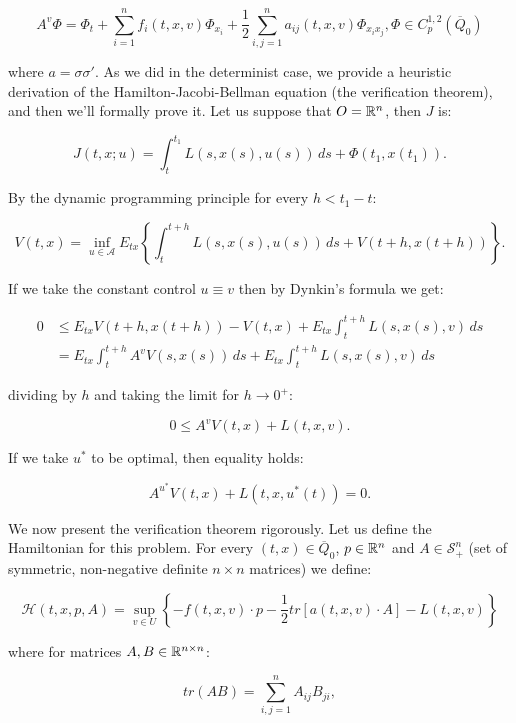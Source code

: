 \begin{equation}\label{2-1-defAwithv}
    A^{v}\Phi = \Phi_t + \sum_{i=1}^nf_i(t,x,v)\Phi_{x_i} + \frac{1}{2}\sum_{i,j=1}^n a_{ij}(t,x,v)\Phi_{x_ix_j}, \Phi\in C^{1,2}_p(\overline{Q}_0)
\end{equation}

where $a=\sigma\sigma'$. As we did in the determinist case, we provide a heuristic derivation of the Hamilton-Jacobi-Bellman equation (the verification theorem), 
and then we'll formally prove it. Let us suppose that $O=\mathbb{R}^n$, then $J$ is:

\begin{equation}
    J(t,x;u) = \int_t^{t_1} L(s,x(s),u(s))\,ds + \Phi(t_1,x(t_1)).
\end{equation}

By the dynamic programming principle for every $h<t_1-t$:

\[V(t,x) = \inf_{u\in\mathcal{A}}E_{tx}\left\{\int_t^{t+h} L(s,x(s),u(s))\,ds + V(t+h,x(t+h))\right\}.\]

If we take the constant control $u\equiv v$ then by Dynkin's formula we get:

\begin{align}
    0 & \leq E_{tx}V(t+h,x(t+h))-V(t,x) + E_{tx}\int_t^{t+h} L(s,x(s),v)\,ds \\
    & = E_{tx}\int_t^{t+h} A^vV(s,x(s))\,ds + E_{tx}\int_t^{t+h} L(s,x(s),v)\,ds
\end{align}

dividing by $h$ and taking the limit for $h\to0^+$:

\[0 \leq A^vV(t,x) + L(t,x,v).\]

If we take $u^{\ast}$ to be optimal, then equality holds:

\[A^{u^{\ast}}V(t,x) + L(t,x,u^{\ast}(t)) = 0.\]

We now present the verification theorem rigorously. Let us define the Hamiltonian for this problem. For every $(t,x)\in\overline{Q}_0$, 
$p\in\mathbb{R}^n$ and $A\in\mathcal{S}_+^n$ (set of symmetric, non-negative definite $n\times n$ matrices) we define:

\begin{equation}\label{2-1-defhamilt}
    \mathcal{H}(t,x,p,A) =  \sup_{v\in U}\left\{-f(t,x,v)\cdot p - \frac{1}{2}tr\left[a(t,x,v)\cdot A\right] - L(t,x,v)\right\}
\end{equation}

where for matrices $A,B\in\mathbb{R}^{n\times n}$:

\begin{equation}
    tr\left(AB\right) = \sum_{i,j=1}^n A_{ij}B_{ji}, 
\end{equation}

